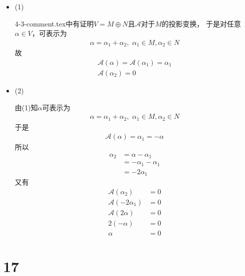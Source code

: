 \documentclass{article}
\begin{document}
\begin{itemize}
  \item (1)

        4-3-comment.tex中有证明$V = M \oplus N$且$\mathscr{A}$对于$M$的投影变换，
        于是对任意$\alpha \in V$，可表示为
        \begin{align*}
          \alpha = \alpha_1 + \alpha_2, \, \,  \alpha_1 \in M, \alpha_2 \in N
        \end{align*}
        故
        \begin{align*}
          \mathscr{A}(\alpha) = \mathscr{A}(\alpha_1) = \alpha_1 \\
          \mathscr{A}(\alpha_2) = 0
        \end{align*}
  \item (2)

        由(1)知$\alpha$可表示为
        \begin{align*}
          \alpha = \alpha_1 + \alpha_2, \, \,  \alpha_1 \in M, \alpha_2 \in N
        \end{align*}
        于是
        \begin{align*}
          \mathscr{A}(\alpha) = \alpha_1 = -\alpha
        \end{align*}
        所以
        \begin{align*}
          \alpha_2 & = \alpha - \alpha_1     \\
                   & = - \alpha_1 - \alpha_1 \\
                   & = -2 \alpha_1
        \end{align*}
        又有
        \begin{align*}
          \mathscr{A}(\alpha_2)   & = 0 \\
          \mathscr{A}(-2\alpha_1) & = 0 \\
          \mathscr{A}(2\alpha)    & = 0 \\
          2 (-\alpha)             & = 0 \\
          \alpha                  & = 0
        \end{align*}
\end{itemize}

\section*{17}
\end{document}
